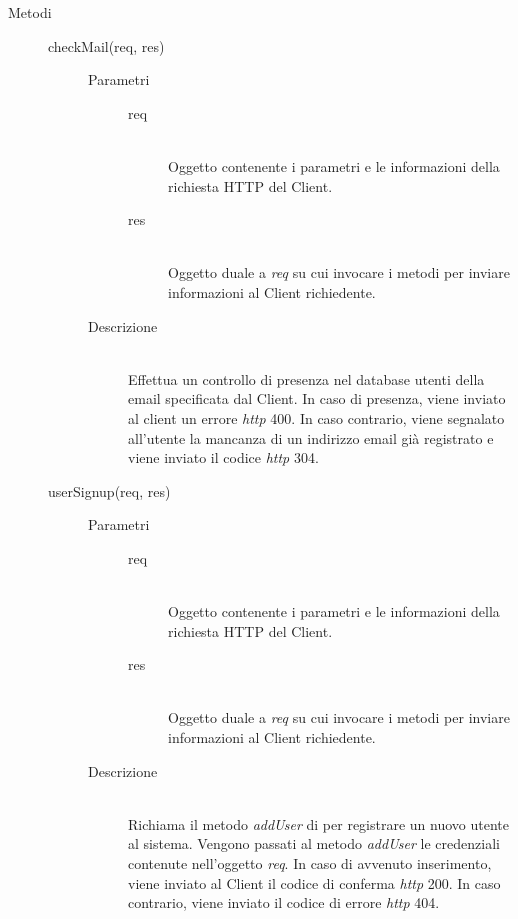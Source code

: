 \begin{description}
 \item[Metodi] \hfill
  \begin{description}
    \item[checkMail(req, res)] \hfill 
      \begin{description}
	   \item[Parametri] \hfill
	  \begin{description}
	    \item[req] \hfill \\
	    Oggetto contenente i parametri e le informazioni della richiesta HTTP del Client.
	    \item[res] \hfill \\
	    Oggetto duale a \textit{req} su cui invocare i metodi per inviare informazioni al Client richiedente.
	  \end{description}
	\item[Descrizione] \hfill \\
	Effettua un controllo di presenza nel database utenti della email specificata dal Client. In caso di presenza, viene inviato al client un errore \textit{http} 400. In caso contrario, viene segnalato all'utente la mancanza 	di un indirizzo email già registrato e viene inviato il codice \textit{http} 304.
      \end{description}
    \item[userSignup(req, res)] \hfill
      \begin{description}
	\item[Parametri] \hfill
	  \begin{description}
	    \item[req] \hfill \\
	    Oggetto contenente i parametri e le informazioni della richiesta HTTP del Client.
	    \item[res] \hfill \\
	    Oggetto duale a \textit{req} su cui invocare i metodi per inviare informazioni al Client richiedente.
	  \end{description}
	\item[Descrizione] \hfill \\
	Richiama il metodo \textit{addUser} di  per registrare un nuovo utente al sistema. Vengono passati al metodo \textit{addUser} le credenziali contenute nell'oggetto \textit{req}. In caso di avvenuto inserimento, viene inviato al Client il codice di conferma \textit{http} 200. In caso contrario, viene inviato il 	codice di errore \textit{http} 404.
      \end{description}
    

\end{description}
\end{description}
